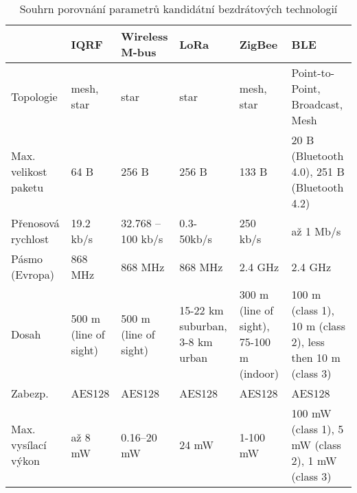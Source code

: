 \begin{table}[!h]
  \caption{Souhrn porovnání parametrů kandidátní bezdrátových technologií}
  \centering
  \begin{ctucolortab}    
  \begin{tabular}{|p{1.5cm}||p{1.3cm}|p{1.5cm}|p{1.4cm}|p{1.5cm}|p{2.8cm}|}
      \hline
                           & \textbf{IQRF}         & \textbf{Wireless M-bus} & \textbf{LoRa}                 & \textbf{ZigBee}                          & \textbf{BLE}                                              \\ \hline \hline
    Topologie               & mesh, star            & star                  & star                            & mesh, star                               & Point-to-Point, Broadcast, Mesh                           \\ \hline
    Max. velikost paketu & 64 B                  & 256 B                 & 256 B                           & 133 B                                    & 20 B (Bluetooth 4.0), 251 B (Bluetooth 4.2)               \\ \hline
    Přenosová rychlost              & 19.2 kb/s             & 32.768 – 100 kb/s     & 0.3-50kb/s                      & 250 kb/s                                 & až 1 Mb/s                                              \\ \hline
    Pásmo (Evropa)          & 868 MHz               & 868 MHz               & 868 MHz                         & 2.4 GHz                                  & 2.4 GHz                                                   \\ \hline
    Dosah                  & 500 m (line of sight) & 500 m (line of sight) & 15-22 km suburban, 3-8 km urban & 300 m (line of sight), 75-100 m (indoor) & 100 m (class 1), 10 m (class 2), less then 10 m (class 3) \\ \hline
    Zabezp.               & AES128               & AES128               & AES128                         & AES128                                  & AES128                                                   \\ \hline
    Max. vysílací výkon & až 8 mW            & 0.16–20 mW            & 24 mW                           & 1-100 mW                                 & 100 mW (class 1), 5 mW (class 2), 1 mW (class 3)          \\ \hline
  \end{tabular}
  \end{ctucolortab}
  \label{table:shrnutiTechnologii}
\end{table}


